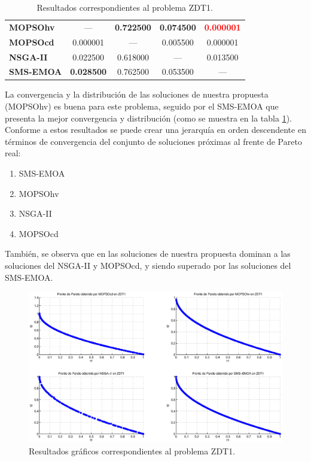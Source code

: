 \begin{table}
\begin{center}
\begin{tabular}{|l||cc|cc|}
	\textbf{MOPSOhv} & ---      & \textbf{0.722500}  & \textbf{0.074500} & \textbf{\textcolor{red}{0.000001}}  \\ 
	\textbf{MOPSOcd} & 0.000001 & ---       & 0.005500 & 0.000001 \\ 
	\textbf{NSGA-II} & 0.022500 & 0.618000  & ---      & 0.013500 \\  
	\textbf{SMS-EMOA}& \textbf{0.028500} & 0.762500  & 0.053500 & --- \\  
	\hline
	\end{tabular}
    \caption{Resultados correspondientes al problema ZDT1.}
  \label{tab:zdt1}
\end{center}
\end{table}

La convergencia y la distribuci\'on de las soluciones de nuestra propuesta (MOPSOhv) es buena para este problema, seguido por el SMS-EMOA 
que presenta la mejor convergencia y distribuci\'on (como se muestra en la tabla \ref{tab:zdt1}). Conforme a estos resultados se puede crear una
jerarqu\'ia en orden descendente en t\'erminos de convergencia del conjunto de soluciones pr\'oximas al frente de Pareto real:

\begin{enumerate}
  \item SMS-EMOA
  \item MOPSOhv
  \item NSGA-II
  \item MOPSOcd
\end{enumerate}

Tambi\'en, se observa que en las soluciones de nuestra propuesta dominan a las soluciones del NSGA-II y MOPSOcd, y siendo superado por las 
soluciones del SMS-EMOA.

\newpage
    \begin{figure}
      \centering
	  \includegraphics[scale=0.45]{Cap4/rzdt1r.eps}      
	\caption{Resultados gr\'aficos correspondientes al problema ZDT1.}
      \label{fig:rZDT1}
      \end{figure}
\clearpage

